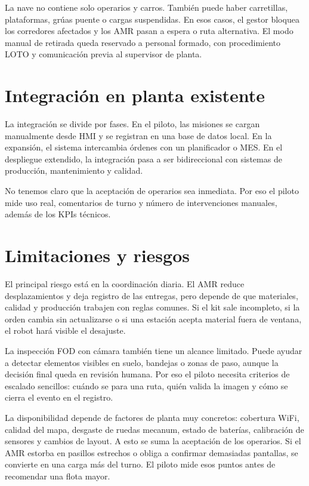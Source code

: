 La nave no contiene solo operarios y carros. También puede haber carretillas, plataformas, grúas puente o cargas suspendidas. En esos casos, el gestor bloquea los corredores afectados y los AMR pasan a espera o ruta alternativa. El modo manual de retirada queda reservado a personal formado, con procedimiento LOTO y comunicación previa al supervisor de planta.

\section{Integración en planta existente}

La integración se divide por fases. En el piloto, las misiones se cargan manualmente desde HMI y se registran en una base de datos local. En la expansión, el sistema intercambia órdenes con un planificador o MES. En el despliegue extendido, la integración pasa a ser bidireccional con sistemas de producción, mantenimiento y calidad.

No tenemos claro que la aceptación de operarios sea inmediata. Por eso el piloto mide uso real, comentarios de turno y número de intervenciones manuales, además de los KPIs técnicos.

\section{Limitaciones y riesgos}

El principal riesgo está en la coordinación diaria. El AMR reduce desplazamientos y deja registro de las entregas, pero depende de que materiales, calidad y producción trabajen con reglas comunes. Si el kit sale incompleto, si la orden cambia sin actualizarse o si una estación acepta material fuera de ventana, el robot hará visible el desajuste.

La inspección FOD con cámara también tiene un alcance limitado. Puede ayudar a detectar elementos visibles en suelo, bandejas o zonas de paso, aunque la decisión final queda en revisión humana. Por eso el piloto necesita criterios de escalado sencillos: cuándo se para una ruta, quién valida la imagen y cómo se cierra el evento en el registro.

La disponibilidad depende de factores de planta muy concretos: cobertura WiFi, calidad del mapa, desgaste de ruedas mecanum, estado de baterías, calibración de sensores y cambios de layout. A esto se suma la aceptación de los operarios. Si el AMR estorba en pasillos estrechos o obliga a confirmar demasiadas pantallas, se convierte en una carga más del turno. El piloto mide esos puntos antes de recomendar una flota mayor.

